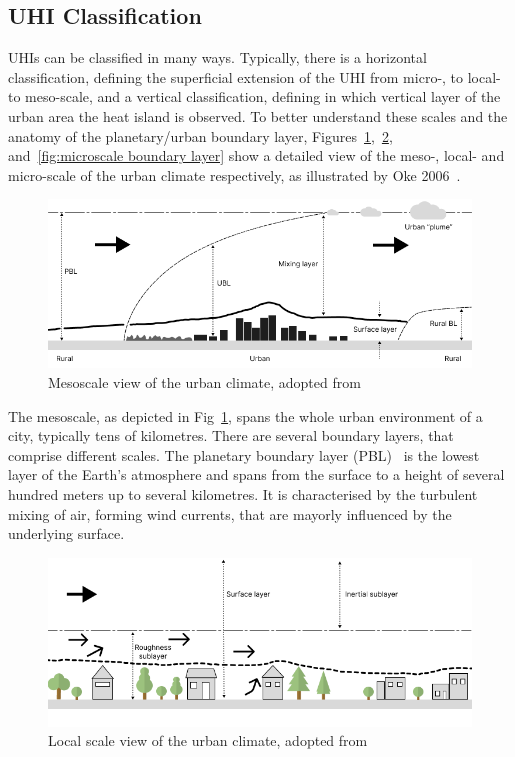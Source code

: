 \subsection{UHI Classification}

UHIs can be classified in many ways. Typically, there is a horizontal classification, defining the superficial extension of the UHI from micro-, to local- to meso-scale, and a vertical classification, defining in which vertical layer of the urban area the heat island is observed. To better understand these scales and the anatomy of the planetary/urban boundary layer, Figures~\ref{fig:mesoscale boundary layer},~\ref{fig:localscale boundary layer}, and~\ref{fig:microscale boundary layer} show a detailed view of the meso-, local- and micro-scale of the urban climate respectively, as illustrated by Oke 2006~\cite{oke2006guideline}.

\begin{figure}[h]
    \centering
    \includegraphics[width=\textwidth]{images/Mesoscale Boundary Layer.png}
    \caption{Mesoscale view of the urban climate, adopted from~\cite{oke2006guideline}}
    \label{fig:mesoscale boundary layer}
\end{figure}

The mesoscale, as depicted in Fig~\ref{fig:mesoscale boundary layer}, spans the whole urban environment of a city, typically tens of kilometres. There are several boundary layers, that comprise different scales. The planetary boundary layer (PBL)~\cite{wyngaard1985structure} is the lowest layer of the Earth's atmosphere and spans from the surface to a height of several hundred meters up to several kilometres. It is characterised by the turbulent mixing of air, forming wind currents, that are mayorly influenced by the underlying surface.

\begin{figure}[h]
    \centering
    \includegraphics[width=\textwidth]{images/Localscale Boundary Layer.png}
    \caption{Local scale view of the urban climate, adopted from~\cite{oke2006guideline}}
    \label{fig:localscale boundary layer}
\end{figure}

